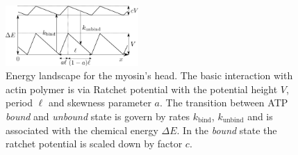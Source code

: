 \documentclass[aps,pre,twocolumn,showpacs,showkeys,superscriptaddress,floatfix]{revtex4-1}
\begin{document}
\begin{figure}[t]
\centering
\includegraphics[width=0.45\textwidth,height=!]{energy}
\caption{
\label{fig:energy}
Energy landscape for the myosin's head.
The basic interaction with actin polymer is via Ratchet potential with the potential height $V$, period $\ell$ and skewness parameter $a$.
The transition between ATP \emph{bound} and \emph{unbound} state is govern by rates $k_\text{bind}$, $k_\text{unbind}$ 
and is associated with the chemical energy $\Delta E$.
In the \emph{bound} state the ratchet potential is scaled down by factor $c$. 
}
\end{figure}
\end{document}
